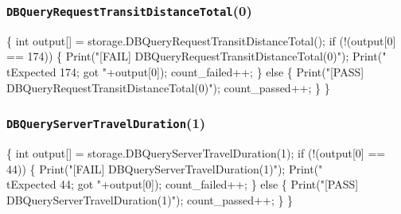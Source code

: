 \documentclass{article}
\def\nwendcode{\endtrivlist \endgroup}
\let\nwdocspar=\par
\begin{document}
\subsubsection{{\tt{}DBQueryRequestTransitDistanceTotal}(0)}
\nwenddocs{}\endmoddef{}
\{
  int output[] = storage.DBQueryRequestTransitDistanceTotal();
  if (!(output[0] == 174)) \{
    Print("[FAIL] DBQueryRequestTransitDistanceTotal(0)");
    Print("\\tExpected 174; got "+output[0]);
    count_failed++;
  \} else \{
    Print("[PASS] DBQueryRequestTransitDistanceTotal(0)");
    count_passed++;
  \}
\}
\nwendcode{}\nwdocspar
\subsubsection{{\tt{}DBQueryServerTravelDuration}(1)}
\nwenddocs{}\endmoddef{}
\{
  int output[] = storage.DBQueryServerTravelDuration(1);
  if (!(output[0] == 44)) \{
    Print("[FAIL] DBQueryServerTravelDuration(1)");
    Print("\\tExpected 44; got "+output[0]);
    count_failed++;
  \} else \{
    Print("[PASS] DBQueryServerTravelDuration(1)");
    count_passed++;
  \}
\}
\nwendcode{}\nwdocspar
\end{document}

